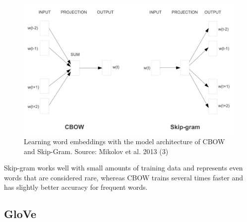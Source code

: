 \documentclass[]{krantz}
\begin{document}
\begin{figure}
\includegraphics[width=\textwidth]{figures/01-01-foundations-applications-of-modern-NLP/01-01_word2vec} \caption{Learning word embeddings with the model architecture of CBOW and Skip-Gram.  Source: Mikolov et al. 2013 (3)}\label{fig:word2vec}
\end{figure}

Skip-gram works well with small amounts of training data and represents even words that are considered rare, whereas CBOW trains several times faster and has slightly better accuracy for frequent words.

\hypertarget{glove}{%
\subsection{GloVe}\label{glove}}
\end{document}
